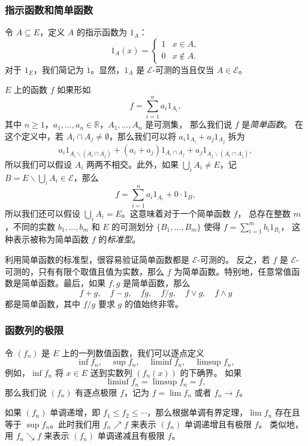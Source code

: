 \documentclass[fontset=none]{Notes}
\begin{document}
\subsubsection{指示函数和简单函数}

令 $A\subseteq E$，定义 $A$ 的指示函数为 $1_A$：
\[
  1_A(x)=\begin{cases}
    1 & x\in A,\\
    0 & x\notin A.
  \end{cases}  
\]
对于 $1_E$，我们简记为 $1$。显然，$1_A$ 是 $\mathcal{E}$-可测的当且仅当
$A\in \mathcal{E}$。

$E$ 上的函数 $f$ 如果形如
\[
  f=\sum_{i=1}^n a_i 1_{A_i},  
\]
其中 $n\geq 1$，$a_1,\dots,a_n\in \mathbb{R}$，$A_1,\dots,A_n$ 是可测集，
那么我们说 $f$ 是\emph{简单函数}。
在这个定义中，若 $A_i\cap A_j\ne\emptyset$，那么我们可以将
$a_i1_{A_i}+a_j1_{A_j}$ 拆为
\[ 
  a_i1_{A_i \smallsetminus (A_i\cap A_j)}+(a_i+a_j)1_{A_i\cap A_j}+a_j 1_{A_j \smallsetminus (A_i\cap A_j)},
\]
所以我们可以假设 $A_i$ 两两不相交。此外，如果 $\bigcup_i A_i\neq E$，记
$B=E \smallsetminus\bigcup_i A_i\in \mathcal{E}$，那么
\[
  f=  \sum_{i=1}^n a_i 1_{A_i}+0\cdot 1_{B},
\]
所以我们还可以假设 $\bigcup_i A_i=E$。这意味着对于一个简单函数 $f$，
总存在整数 $m$，不同的实数 $b_1,\dots,b_m$ 和 $E$ 的可测划分
$\{B_1,\dots,B_m\}$ 使得 $f=\sum_{i=1}^m b_i 1_{B_i}$，
这种表示被称为简单函数 $f$ 的\emph{标准型}。

利用简单函数的标准型，很容易验证简单函数都是 $\mathcal{E}$-可测的。
反之，若 $f$ 是 $\mathcal{E}$-可测的，只有有限个取值且值为实数，那么
$f$ 为简单函数。特别地，任意常值函数是简单函数。最后，如果 $f,g$
是简单函数，那么
\[
  f+g,\quad f-g,\quad fg,\quad f/g,\quad f\vee g,\quad f\wedge g  
\]
都是简单函数，其中 $f/g$ 要求 $g$ 的值始终非零。

\subsubsection{函数列的极限}

令 $(f_n)$ 是 $E$ 上的一列数值函数，我们可以逐点定义
\begin{equation}\label{eq:inf and sup}
  \inf f_n,\quad \sup f_n,\quad \liminf f_n,\quad \limsup f_n,
\end{equation}
例如，$\inf f_n$ 将 $x\in E$ 送到实数列 $(f_n(x))$ 的下确界。
如果
\[
  \liminf f_n=\limsup f_n=f,
\]
那么我们说 $(f_n)$ 有逐点极限 $f$，记为 $f=\lim f_n$ 或者 $f_n\to f$。

如果 $(f_n)$ 单调递增，即 $f_1\leq f_2\leq \cdots$，那么根据单调有界定理，$\lim f_n$
存在且等于 $\sup f_n$。此时我们用 $f_n\nearrow f$ 来表示 $(f_n)$ 单调递增且有极限 $f$。
类似地，用 $f_n\searrow f$ 来表示 $(f_n)$ 单调递减且有极限 $f$。
\end{document}
